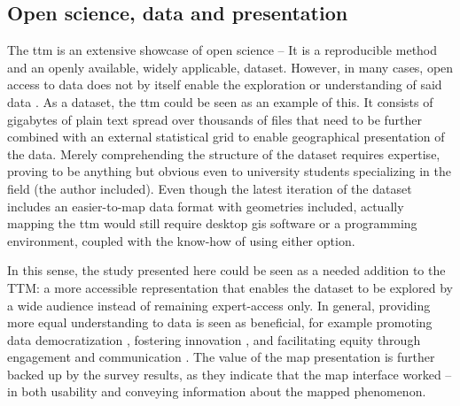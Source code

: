 \subsection{Open science, data and presentation}
The \acrshort{ttm} is an extensive showcase of open science --
It is a reproducible method and an openly available, widely applicable, dataset.
However, in many cases, open access to data does not by itself enable
the exploration or understanding of said data \parencite{obr2016}.
As a dataset, the \acrshort{ttm} could be seen as an example of this.
It consists of gigabytes of plain text spread over thousands of files
that need to be further combined with an external statistical grid to enable
geographical presentation of the data.
Merely comprehending the structure of the dataset requires expertise,
proving to be anything but obvious even to university students specializing in the field
(the author included).
Even though the latest iteration of the dataset \parencite{fin2023}
includes an easier-to-map data format with geometries included,
actually mapping the \acrshort{ttm} would still require
desktop \acrshort{gis} software or a programming environment,
coupled with the know-how of using either option.

In this sense, the study presented here could be seen as a needed addition to the TTM:
a more accessible representation that enables the dataset to be explored by a wide audience
instead of remaining expert-access only.
In general, providing more equal understanding to data is seen as beneficial,
for example promoting data democratization \parencite{awa2020},
fostering innovation \parencite{man2011},
and facilitating equity through engagement and communication \parencite{kra2021}.
The value of the map presentation is further backed up by the survey results,
as they indicate that the map interface worked --
in both usability and conveying information about the mapped phenomenon.

